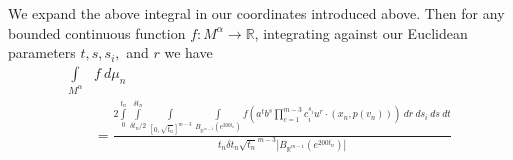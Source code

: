 \documentclass[10pt,reqno]{amsart}
\theoremstyle{Theorem}
\theoremstyle{definition}
\theoremstyle{remark}
\newcommand{\note}[1]{\marginpar{{\color{red}\footnotesize \begin{spacing}{1}#1\end{spacing}}}}
\newcommand{\restrict}[2]{{#1}{|_{{ #2}}}}
\def \Lie{\mathrm{Lie}}
\def \Ad{\mathrm{Ad}}
\newcommand{\td}{\tilde}
\newcommand{\R}{\mathbb {R}}
\newcommand{\inv}{^{-1}}
\renewcommand\P{\mathbb{P}}
\def\red{\color{red}}
\begin{document}
We expand the above integral in our coordinates introduced above.
Then for   any bounded continuous function $f\colon M^\alpha  \to \R$, integrating against our Euclidean parameters $t,s, s_i,$ and $r$ we have
\begin{equation}\label{eq:lazyAaron}
\begin{aligned}
\int\limits_{M^\alpha } &f \ d  \mu_n
\quad \quad
\\
&=  \frac{\displaystyle 2 \int\limits_{0}^{t_n} \int\limits_{\delta t_n /2}^{\delta t_n} \int\limits_{[0, \sqrt{t_n}]^{m-3}}
\int\limits_{B_{\R^{m-1}}(e^{200t_n})} f\left (a^tb^s\prod_{c=1}^{m-3} c_i^{s_i}u^r \cdot (x_n, p(v_n) )\right ) \  dr   \ d{s_i}\ ds\ dt  }{{t_n}{\delta t_n}{\sqrt{t_n}}^{m-3}{|B_{\R^{m-1}}(e^{200t_n})|}}
 \end{aligned}
 \end{equation}
\end{document}
